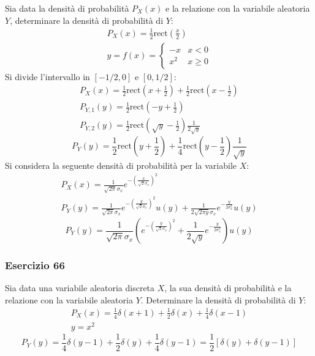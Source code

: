 \documentclass{article}
\newcommand{\rect}{\mathrm{rect}}
\begin{document}
Sia data la densità di probabilità $P_X(x)$ e la relazione con la variabile aleatoria $Y$, determinare la densità di probabilità di $Y$:
\begin{gather*}
    P_X(x)=\displaystyle\frac{1}{2}\rect\left(\frac{x}{2}\right)\\
    y=f(x)=\begin{cases}
        -x&x<0\\
        x^2&x\geq 0
    \end{cases}
\end{gather*}
Si divide l'intervallo in $[-1/2,0]$ e $[0,1/2]$:
\begin{gather*}
    P_X(x)=\displaystyle\frac{1}{2}\rect\left(x+\frac{1}{2}\right)+\frac{1}{2}\rect\left(x-\frac{1}{2}\right)\\
    P_{Y,1}(y)=\displaystyle\frac{1}{2}\rect\left(-y+\frac{1}{2}\right)\\
    P_{Y,2}(y)=\displaystyle\frac{1}{2}\rect\left(\sqrt{y}-\frac{1}{2}\right)\frac{1}{2\sqrt{y}}
\end{gather*}
\begin{equation}
    P_Y(y)=\displaystyle\frac{1}{2}\rect\left(y+\frac{1}{2}\right)+\frac{1}{4}\rect\left(y-\frac{1}{2}\right)\frac{1}{\sqrt{y}}
\end{equation}
Si considera la seguente densità di probabilità per la variabile $X$:
\begin{gather*}
    P_X(x)=\displaystyle\frac{1}{\sqrt{2\pi}\sigma_x}e^{-\left(\frac{x}{\sqrt2\sigma_x}\right)^2}\\
    P_Y(y)=\displaystyle\frac{1}{\sqrt{2\pi}\sigma_x}e^{-\left(\frac{y}{\sqrt2\sigma_x}\right)^2}u(y)+\frac{1}{2\sqrt{2\pi y} \sigma_x}e^{-\frac{y}{2\sigma_x^2}}u(y)
\end{gather*}
\begin{equation}
    P_Y(y)=\displaystyle\frac{1}{\sqrt{2\pi}\sigma_x}\left(e^{-\left(\frac{y}{\sqrt2\sigma_x}\right)^2}+\frac{1}{2\sqrt{y}}e^{-\frac{y}{2\sigma_x^2}}\right)u(y)
\end{equation}

\subsubsection*{Esercizio 66}

Sia data una variabile aleatoria discreta $X$, la sua densità di probabilità e la relazione con la variabile aleatoria $Y$. Determinare la densità di probabilità di $Y$:
\begin{gather*}
    P_X(x)=\displaystyle\frac{1}{4}\delta(x+1)+\frac{1}{2}\delta(x)+\frac{1}{4}\delta(x-1)\\
    y=x^2
\end{gather*}
\begin{equation}
    P_Y(y)=\displaystyle\frac{1}{4}\delta(y-1)+\frac{1}{2}\delta(y)+\frac{1}{4}\delta(y-1)=\frac{1}{2}\left[\delta(y)+\delta(y-1)\right]
\end{equation}
\end{document}
